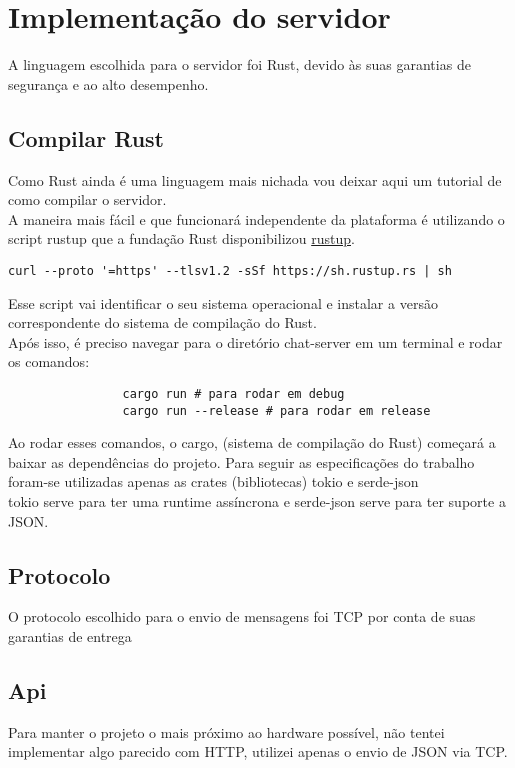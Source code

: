 \documentclass{article}
\begin{document}
\section{Implementação do servidor}
{
    A linguagem escolhida para o servidor foi Rust, devido às suas garantias de segurança e ao alto desempenho.
    \newpage
    \subsection{Compilar Rust}
    {
        Como Rust ainda é uma linguagem mais nichada vou deixar aqui um tutorial de como compilar o servidor.\\
        A maneira mais fácil e que funcionará independente da plataforma é utilizando o script rustup que a fundação Rust disponibilizou
        \href{https://rustup.rs/}{rustup}.
        \begin{verbatim}
curl --proto '=https' --tlsv1.2 -sSf https://sh.rustup.rs | sh
        \end{verbatim}
        Esse script vai identificar o seu sistema operacional e instalar a versão correspondente do sistema de compilação do Rust. \\
        Após isso, é preciso navegar para o diretório chat-server em um terminal e rodar os comandos: \\
        \begin{center}
            \begin{verbatim}
                cargo run # para rodar em debug 
                cargo run --release # para rodar em release                            
            \end{verbatim}
        \end{center}
        Ao rodar esses comandos, o cargo, (sistema de compilação do Rust) começará a baixar as dependências do projeto.
        Para seguir as especificações do trabalho foram-se utilizadas apenas as crates (bibliotecas) tokio e serde-json \\
        tokio serve para ter uma runtime assíncrona e serde-json serve para ter suporte a JSON.
    }    

    \subsection{Protocolo}
    {
        O protocolo escolhido para o envio de mensagens foi TCP por conta de suas garantias de entrega
    }
    \subsection{Api}
    {
        Para manter o projeto o mais próximo ao hardware possível, não tentei implementar algo parecido com HTTP, utilizei apenas o envio de JSON via TCP.
}}
\end{document}
